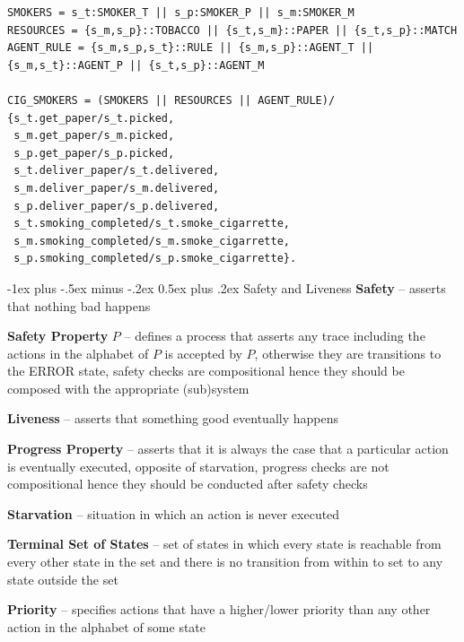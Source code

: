 \documentclass[letterpaper, 8pt]{extarticle}
\makeatletter
\renewcommand{\section}{\@startsection{section}{1}{0mm}%
                                {-1ex plus -.5ex minus -.2ex}%
                                {0.5ex plus .2ex}%
                                {\normalfont\normalsize\bfseries}}
\makeatother
\begin{document}
\begin{multicols*}{5}
\begin{lstlisting}
SMOKERS = s_t:SMOKER_T || s_p:SMOKER_P || s_m:SMOKER_M
RESOURCES = {s_m,s_p}::TOBACCO || {s_t,s_m}::PAPER || {s_t,s_p}::MATCH
AGENT_RULE = {s_m,s_p,s_t}::RULE || {s_m,s_p}::AGENT_T || {s_m,s_t}::AGENT_P || {s_t,s_p}::AGENT_M

CIG_SMOKERS = (SMOKERS || RESOURCES || AGENT_RULE)/
{s_t.get_paper/s_t.picked,
 s_m.get_paper/s_m.picked,
 s_p.get_paper/s_p.picked,
 s_t.deliver_paper/s_t.delivered,
 s_m.deliver_paper/s_m.delivered,
 s_p.deliver_paper/s_p.delivered,
 s_t.smoking_completed/s_t.smoke_cigarrette,
 s_m.smoking_completed/s_m.smoke_cigarrette,
 s_p.smoking_completed/s_p.smoke_cigarrette}.
\end{lstlisting}

\section{Safety and Liveness}
\textbf{Safety} -- asserts that nothing bad happens

\textbf{Safety Property} $P$ -- defines a process that asserts any trace including the actions in the alphabet of $P$ is accepted by $P$, otherwise they are transitions to the ERROR state, safety checks are compositional hence they should be composed with the appropriate (sub)system

\textbf{Liveness} -- asserts that something good eventually happens

\textbf{Progress Property} -- asserts that it is always the case that a particular action is eventually executed, opposite of starvation, progress checks are not compositional hence they should be conducted after safety checks

\textbf{Starvation} -- situation in which an action is never executed

\textbf{Terminal Set of States} -- set of states in which every state is reachable from every other state in the set and there is no transition from within to set to any state outside the set

\textbf{Priority} -- specifies actions that have a higher/lower priority than any other action in the alphabet of some state




\end{multicols*}
\end{document}
